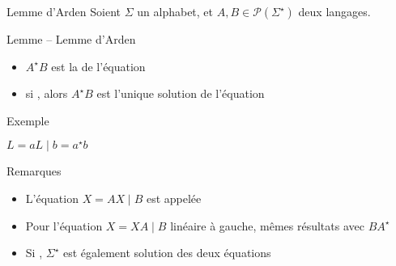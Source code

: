 
\begingroup

\begin{frame}{Lemme d'Arden}
  Soient $\Sigma$ un alphabet, et $A, B \in \mathscr{P}(\Sigma^\star)$ deux langages.
  \begin{block}{Lemme -- Lemme d'Arden}
    \begin{itemize}
    \item \alert{$A^\star B$} est la  de l'équation 
    \item si , alors \alert{$A^\star B$} est l'\alert{unique} solution de l'équation 
    \end{itemize}
  \end{block}
  \begin{exampleblock}{Exemple}
    \noindent\begin{minipage}{.4\textwidth}
    \end{minipage}%
    \begin{minipage}{.6\textwidth}
      $ L = a L \mid b = a^\star b$
    \end{minipage}
  \end{exampleblock}
  \begin{block}{Remarques}
    \begin{itemize}
    \item {\small L'équation $X = AX \mid B$ est appelée }
    \item {\small Pour l'équation $X = XA \mid B$ linéaire à gauche, mêmes résultats avec $B A^\star$}
    \item {\small Si , $\Sigma^\star$ est également solution des deux équations}
    \end{itemize}
  \end{block}
\end{frame}

\endgroup
